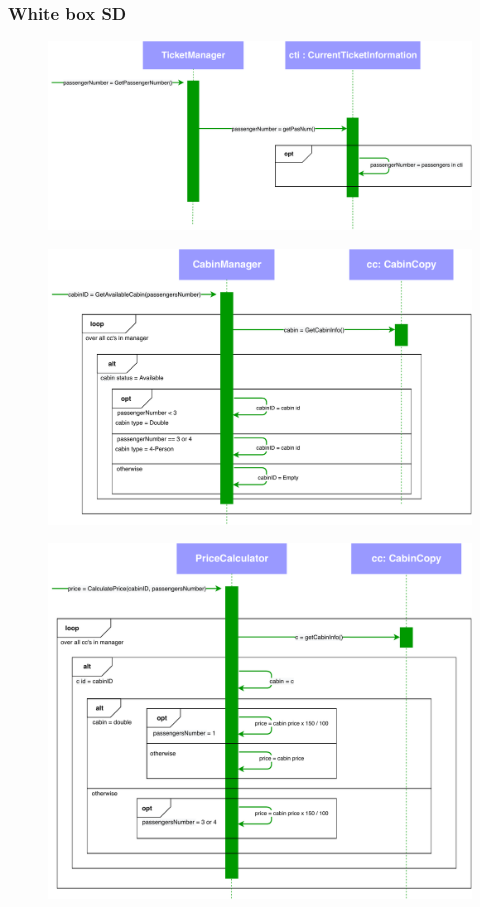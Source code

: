 \subsubsection{White box SD}
\creator{\studentB}
\newline
\begin{figure}[H]
    \centering
\includegraphics[scale=0.5]{Iteration_3/Files/UC5_wb1.pdf}
\end{figure}
\begin{figure}[H]
    \centering
\includegraphics[scale=0.5]{Iteration_3/Files/UC5_wb2.pdf}
\end{figure}
\begin{figure}[H]
    \centering
\includegraphics[scale=0.5]{Iteration_3/Files/UC5_wb3.pdf}
\end{figure}
